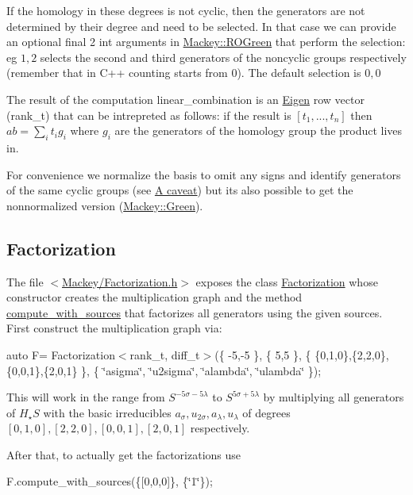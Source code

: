 If the homology in these degrees is not cyclic, then the generators are not determined by their degree and need to be selected. In that case we can provide an optional final 2 {\ttfamily int} arguments in {\ttfamily \hyperlink{namespaceMackey_a2bd86833844ca62d76c47a54aeb0bb77}{Mackey\+::\+R\+O\+Green}} that perform the selection\+: eg $1,2$ selects the second and third generators of the noncyclic groups respectively (remember that in C++ counting starts from $0$). The default selection is $0,0$

The result of the computation {\ttfamily linear\+\_\+combination} is an \hyperlink{namespaceEigen}{Eigen} row vector ({\ttfamily rank\+\_\+t}) that can be intrepreted as follows\+: if the result is $[t_1,...,t_n]$ then $ ab=\sum_it_ig_i$ where $g_i$ are the generators of the homology group the product lives in.

For convenience we normalize the basis to omit any signs and identify generators of the same cyclic groups (see \hyperlink{math_caveat}{A caveat}) but it\textquotesingle{}s also possible to get the nonnormalized version (\hyperlink{classMackey_1_1Green}{Mackey\+::\+Green}).\hypertarget{use_step1fact}{}\subsection{Factorization}\label{use_step1fact}
The file {\ttfamily $<$\hyperlink{Factorization_8h}{Mackey/\+Factorization.\+h}$>$} exposes the class \hyperlink{classMackey_1_1Factorization}{Factorization} whose constructor creates the multiplication graph and the method \hyperlink{classMackey_1_1Factorization_a2e135a37687fc3d69cd16a8729dd19eb}{compute\+\_\+with\+\_\+sources} that factorizes all generators using the given sources. First construct the multiplication graph via\+:

{\ttfamily auto F= Factorization$<$rank\+\_\+t, diff\+\_\+t$>$(\{ -\/5,-\/5 \}, \{ 5,5 \}, \{ \{0,1,0\},\{2,2,0\},\{0,0,1\},\{2,0,1\} \}, \{ \char`\"{}asigma\char`\"{}, \char`\"{}u2sigma\char`\"{}, \char`\"{}alambda\char`\"{}, \char`\"{}ulambda\char`\"{} \});}

This will work in the range from $S^{-5\sigma-5\lambda}$ to $S^{5\sigma+5\lambda}$ by multiplying all generators of $H_{\star}S$ with the basic irreducibles $ a_{\sigma}, u_{2\sigma}, a_{\lambda}, u_{\lambda}$ of degrees $[0,1,0],[2,2,0],[0,0,1],[2,0,1]$ respectively.

After that, to actually get the factorizations use

{\ttfamily F.\+compute\+\_\+with\+\_\+sources(\{\mbox{[}0,0,0\mbox{]}\}, \{\char`\"{}1\char`\"{}\});}

